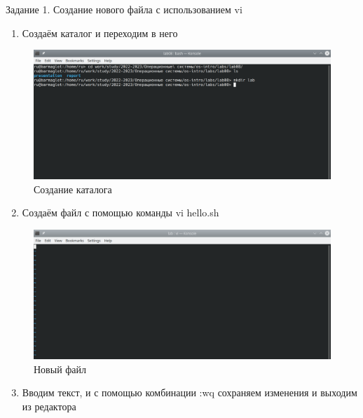 \begin{frame}{Задание 1. Создание нового файла с использованием vi}
\begin{enumerate}
\tightlist
\item
  Создаём каталог и переходим в него
\end{enumerate}

\begin{figure}
\hypertarget{fig:001}{%
\centering
\includegraphics[width=1\textwidth,height=\textheight]{image/1.png}
\caption{Создание каталога}\label{fig:001}
}
\end{figure}

\begin{enumerate}
\setcounter{enumi}{1}
\tightlist
\item
  Создаём файл с помощью команды vi hello.sh
\end{enumerate}

\begin{figure}
\hypertarget{fig:002}{%
\centering
\includegraphics[width=1\textwidth,height=\textheight]{image/2.png}
\caption{Новый файл}\label{fig:002}
}
\end{figure}

\begin{enumerate}
\setcounter{enumi}{2}
\tightlist
\item
  Вводим текст, и с помощью комбинации :wq сохраняем изменения и выходим
  из редактора
\end{enumerate}


\end{frame}
